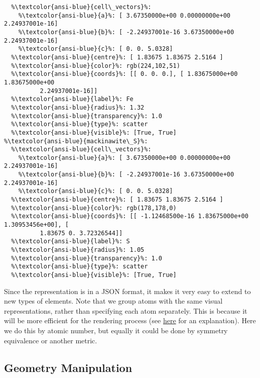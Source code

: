 \documentclass[10pt,parskip=half,
	toc=sectionentrywithdots,
	bibliography=totocnumbered,
	captions=tableheading,numbers=noendperiod]{scrartcl}
\begin{document}
\begin{lstlisting}[language={},postbreak={},numbers=none,xrightmargin=7pt,belowskip=5pt,aboveskip=5pt,breakindent=0pt,escapechar=\%]
%\textcolor{ansi-blue}{mackinawite\_Fe}%: 
  %\textcolor{ansi-blue}{cell\_vectors}%: 
    %\textcolor{ansi-blue}{a}%: [ 3.67350000e+00 0.00000000e+00 2.24937001e-16]
    %\textcolor{ansi-blue}{b}%: [ -2.24937001e-16 3.67350000e+00 2.24937001e-16]
    %\textcolor{ansi-blue}{c}%: [ 0. 0. 5.0328]
  %\textcolor{ansi-blue}{centre}%: [ 1.83675 1.83675 2.5164 ]
  %\textcolor{ansi-blue}{color}%: rgb(224,102,51)
  %\textcolor{ansi-blue}{coords}%: [[ 0. 0. 0.], [ 1.83675000e+00 1.83675000e+00 
          2.24937001e-16]]
  %\textcolor{ansi-blue}{label}%: Fe
  %\textcolor{ansi-blue}{radius}%: 1.32
  %\textcolor{ansi-blue}{transparency}%: 1.0
  %\textcolor{ansi-blue}{type}%: scatter
  %\textcolor{ansi-blue}{visible}%: [True, True]
%\textcolor{ansi-blue}{mackinawite\_S}%: 
  %\textcolor{ansi-blue}{cell\_vectors}%: 
    %\textcolor{ansi-blue}{a}%: [ 3.67350000e+00 0.00000000e+00 2.24937001e-16]
    %\textcolor{ansi-blue}{b}%: [ -2.24937001e-16 3.67350000e+00 2.24937001e-16]
    %\textcolor{ansi-blue}{c}%: [ 0. 0. 5.0328]
  %\textcolor{ansi-blue}{centre}%: [ 1.83675 1.83675 2.5164 ]
  %\textcolor{ansi-blue}{color}%: rgb(178,178,0)
  %\textcolor{ansi-blue}{coords}%: [[ -1.12468500e-16 1.83675000e+00 1.30953456e+00], [ 
          1.83675 0. 3.72326544]]
  %\textcolor{ansi-blue}{label}%: S
  %\textcolor{ansi-blue}{radius}%: 1.05
  %\textcolor{ansi-blue}{transparency}%: 1.0
  %\textcolor{ansi-blue}{type}%: scatter
  %\textcolor{ansi-blue}{visible}%: [True, True]

\end{lstlisting}

Since the representation is in a JSON format, it makes it very easy to
extend to new types of elements. Note that we group atoms with the same
visual representations, rather than specifying each atom separately.
This is because it will be more efficient for the rendering process (see
\href{http://www.ianww.com/blog/2012/11/04/optimizing-three-dot-js-performance-simulating-tens-of-thousands-of-independent-moving-objects/}{here}
for an explanation). Here we do this by atomic number, but equally it
could be done by symmetry equivalence or another metric.

\subsection{Geometry Manipulation}\label{geometry-manipulation}
\end{document}
